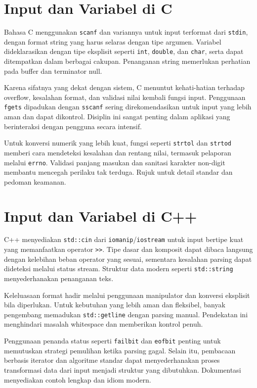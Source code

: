 \documentclass[../main.tex]{subfiles}
\begin{document}
\section{Input dan Variabel di C}
Bahasa C menggunakan \texttt{scanf} dan variannya untuk input terformat dari \texttt{stdin}, dengan format string yang harus selaras dengan tipe argumen. Variabel dideklarasikan dengan tipe eksplisit seperti \texttt{int}, \texttt{double}, dan \texttt{char}, serta dapat ditempatkan dalam berbagai cakupan. Penanganan string memerlukan perhatian pada buffer dan terminator null.

Karena sifatnya yang dekat dengan sistem, C menuntut kehati-hatian terhadap overflow, kesalahan format, dan validasi nilai kembali fungsi input. Penggunaan \texttt{fgets} dipadukan dengan \texttt{sscanf} sering direkomendasikan untuk input yang lebih aman dan dapat dikontrol. Disiplin ini sangat penting dalam aplikasi yang berinteraksi dengan pengguna secara intensif.

Untuk konversi numerik yang lebih kuat, fungsi seperti \texttt{strtol} dan \texttt{strtod} memberi cara mendeteksi kesalahan dan rentang nilai, termasuk pelaporan melalui \texttt{errno}. Validasi panjang masukan dan sanitasi karakter non-digit membantu mencegah perilaku tak terduga. Rujuk \textcite{gnu-c-manual,iso-c-draft-n1570} untuk detail standar dan pedoman keamanan.

\section{Input dan Variabel di C++}
C++ menyediakan \texttt{std::cin} dari \texttt{iomanip}/\texttt{iostream} untuk input bertipe kuat yang memanfaatkan operator \texttt{>>}. Tipe dasar dan komposit dapat dibaca langsung dengan kelebihan beban operator yang sesuai, sementara kesalahan parsing dapat dideteksi melalui status stream. Struktur data modern seperti \texttt{std::string} menyederhanakan penanganan teks.

Keleluasaan format hadir melalui penggunaan manipulator dan konversi eksplisit bila diperlukan. Untuk kebutuhan yang lebih aman dan fleksibel, banyak pengembang memadukan \texttt{std::getline} dengan parsing manual. Pendekatan ini menghindari masalah whitespace dan memberikan kontrol penuh.

Penggunaan penanda status seperti \texttt{failbit} dan \texttt{eofbit} penting untuk memutuskan strategi pemulihan ketika parsing gagal. Selain itu, pembacaan berbasis iterator dan algoritme standar dapat menyederhanakan proses transformasi data dari input menjadi struktur yang dibutuhkan. Dokumentasi \textcite{cplusplus-io,cpp-reference} menyediakan contoh lengkap dan idiom modern.
\end{document}
